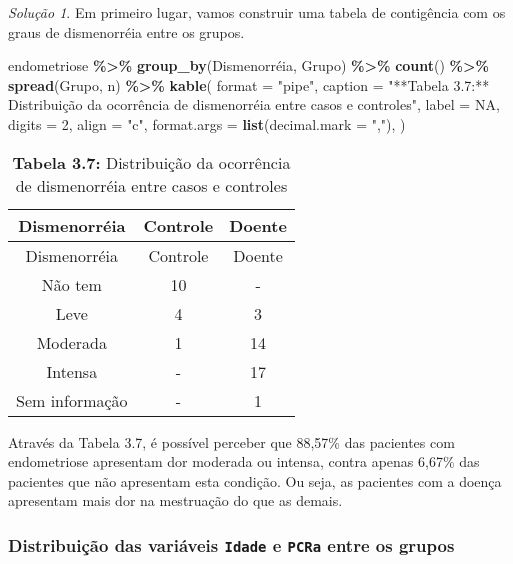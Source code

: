 \documentclass[
]{latex/krantz}
\newenvironment{Shaded}{\begin{snugshade}}{\end{snugshade}}
\newcommand{\AttributeTok}[1]{\textcolor[rgb]{0.13,0.29,0.53}{#1}}
\newcommand{\ConstantTok}[1]{\textcolor[rgb]{0.56,0.35,0.01}{#1}}
\newcommand{\DecValTok}[1]{\textcolor[rgb]{0.00,0.00,0.81}{#1}}
\newcommand{\FunctionTok}[1]{\textcolor[rgb]{0.13,0.29,0.53}{\textbf{#1}}}
\newcommand{\NormalTok}[1]{#1}
\newcommand{\SpecialCharTok}[1]{\textcolor[rgb]{0.81,0.36,0.00}{\textbf{#1}}}
\newcommand{\StringTok}[1]{\textcolor[rgb]{0.31,0.60,0.02}{#1}}
\theoremstyle{definition}
\theoremstyle{definition}
\theoremstyle{definition}
\theoremstyle{definition}
\theoremstyle{remark}
\newtheorem*{solution}{Solução}
\begin{document}
\begin{solution}
Em primeiro lugar, vamos construir uma tabela de contigência com os graus de dismenorréia entre os grupos.

\begin{Shaded}
\begin{Highlighting}[]
\NormalTok{endometriose }\SpecialCharTok{\%\textgreater{}\%}
  \FunctionTok{group\_by}\NormalTok{(Dismenorréia, Grupo) }\SpecialCharTok{\%\textgreater{}\%}
  \FunctionTok{count}\NormalTok{() }\SpecialCharTok{\%\textgreater{}\%}
  \FunctionTok{spread}\NormalTok{(Grupo, n) }\SpecialCharTok{\%\textgreater{}\%}
  \FunctionTok{kable}\NormalTok{(}
    \AttributeTok{format =} \StringTok{"pipe"}\NormalTok{,}
    \AttributeTok{caption =} \StringTok{"**Tabela 3.7:** Distribuição da ocorrência de dismenorréia entre casos e controles"}\NormalTok{,}
    \AttributeTok{label =} \ConstantTok{NA}\NormalTok{,}
    \AttributeTok{digits =} \DecValTok{2}\NormalTok{,}
    \AttributeTok{align =} \StringTok{"c"}\NormalTok{,}
    \AttributeTok{format.args =} \FunctionTok{list}\NormalTok{(}\AttributeTok{decimal.mark =} \StringTok{","}\NormalTok{),}
\NormalTok{  )}
\end{Highlighting}
\end{Shaded}

\begin{longtable}[]{@{}ccc@{}}
\caption{\textbf{Tabela 3.7:} Distribuição da ocorrência de dismenorréia entre casos e controles}\tabularnewline
\toprule\noalign{}
Dismenorréia & Controle & Doente \\
\midrule\noalign{}
\endfirsthead
\toprule\noalign{}
Dismenorréia & Controle & Doente \\
\midrule\noalign{}
\endhead
\bottomrule\noalign{}
\endlastfoot
Não tem & 10 & - \\
Leve & 4 & 3 \\
Moderada & 1 & 14 \\
Intensa & - & 17 \\
Sem informação & - & 1 \\
\end{longtable}

Através da Tabela 3.7, é possível perceber que 88,57\% das pacientes com endometriose apresentam dor moderada ou intensa, contra apenas 6,67\% das pacientes que não apresentam esta condição. Ou seja, as pacientes com a doença apresentam mais dor na mestruação do que as demais.

\hypertarget{distribuiuxe7uxe3o-das-variuxe1veis-idade-e-pcra-entre-os-grupos}{%
\subsubsection*{\texorpdfstring{Distribuição das variáveis \texttt{Idade} e \texttt{PCRa} entre os grupos}{Distribuição das variáveis Idade e PCRa entre os grupos}}\label{distribuiuxe7uxe3o-das-variuxe1veis-idade-e-pcra-entre-os-grupos}}


\end{solution}
\end{document}
